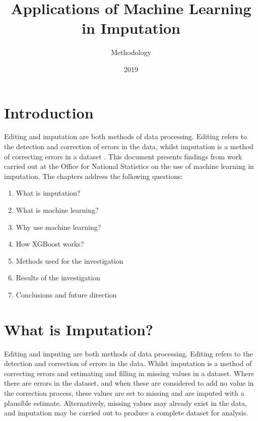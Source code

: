 \documentclass[]{book}
\title{Applications of Machine Learning in Imputation}
\author{Methodology}
\date{2019}
\providecommand{\tightlist}{%
  \setlength{\itemsep}{0pt}\setlength{\parskip}{0pt}}
\begin{document}
\maketitle

{
\setcounter{tocdepth}{1}
\tableofcontents
}
\chapter{Introduction}\label{introduction}

Editing and imputation are both methods of data processing. Editing
refers to the detection and correction of errors in the data, whilst
imputation is a method of correcting errors in a dataset \citep{deWaal}.
This document presents findings from work carried out at the Office for
National Statistics on the use of machine learning in imputation. The
chapters address the following questions:

\begin{enumerate}
\def\labelenumi{\arabic{enumi})}
\tightlist
\item
  What is imputation?\\
\item
  What is machine learning?\\
\item
  Why use machine learning?\\
\item
  How XGBoost works?\\
\item
  Methods used for the investigation\\
\item
  Results of the investigation\\
\item
  Conclusions and future direction
\end{enumerate}

\chapter{What is Imputation?}\label{what-is-imputation}

Editing and imputing are both methods of data processing. Editing refers
to the detection and correction of errors in the data. Whilst imputation
is a method of correcting errors and estimating and filling in missing
values in a dataset. Where there are errors in the dataset, and when
these are considered to add no value in the correction process, these
values are set to missing and are imputed with a plausible estimate.
Alternatively, missing values may already exist in the data, and
imputation may be carried out to produce a complete dataset for
analysis.
\end{document}
